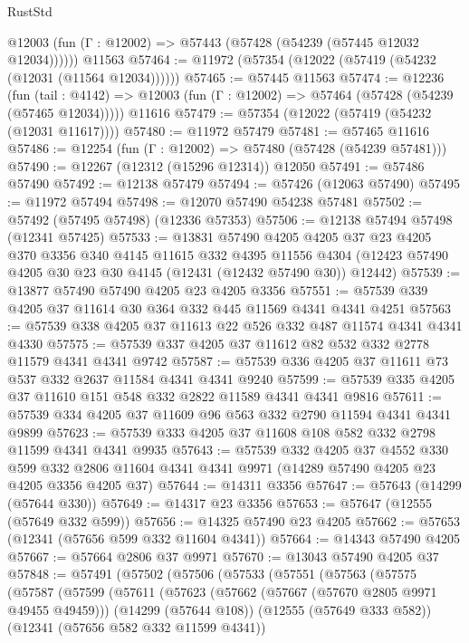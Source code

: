 \begin{lexlean}{RustStd}
\begin{coremodule}
      @12003 (fun (Γ : @12002) => @57443 (@57428 (@54239 (@57445 @12032 @12034))))))
    @11563
@57464 := @11972 (@57354 (@12022 (@57419 (@54232 (@12031 (@11564 @12034))))))
@57465 := @57445 @11563
@57474 := @12236
    (fun (tail : @4142) => @12003 (fun (Γ : @12002) => @57464 (@57428 (@54239 (@57465 @12034)))))
    @11616
@57479 := @57354 (@12022 (@57419 (@54232 (@12031 @11617))))
@57480 := @11972 @57479
@57481 := @57465 @11616
@57486 := @12254 (fun (Γ : @12002) => @57480 (@57428 (@54239 @57481)))
@57490 := @12267 (@12312 (@15296 @12314)) @12050
@57491 := @57486 @57490
@57492 := @12138 @57479
@57494 := @57426 (@12063 @57490)
@57495 := @11972 @57494
@57498 := @12070 @57490 @54238 @57481
@57502 := @57492 (@57495 @57498) (@12336 @57353)
@57506 := @12138 @57494 @57498 (@12341 @57425)
@57533 := @13831
    @57490
    @4205
    @4205
    @37
    @23
    @4205
    @370
    @3356
    @340
    @4145
    @11615
    @332
    @4395
    @11556
    @4304
    (@12423 @57490 @4205 @30 @23 @30 @4145 (@12431 (@12432 @57490 @30)) @12442)
@57539 := @13877 @57490 @57490 @4205 @23 @4205 @3356
@57551 := @57539 @339 @4205 @37 @11614 @30 @364 @332 @445 @11569 @4341 @4341 @4251
@57563 := @57539 @338 @4205 @37 @11613 @22 @526 @332 @487 @11574 @4341 @4341 @4330
@57575 := @57539 @337 @4205 @37 @11612 @82 @532 @332 @2778 @11579 @4341 @4341 @9742
@57587 := @57539 @336 @4205 @37 @11611 @73 @537 @332 @2637 @11584 @4341 @4341 @9240
@57599 := @57539 @335 @4205 @37 @11610 @151 @548 @332 @2822 @11589 @4341 @4341 @9816
@57611 := @57539 @334 @4205 @37 @11609 @96 @563 @332 @2790 @11594 @4341 @4341 @9899
@57623 := @57539 @333 @4205 @37 @11608 @108 @582 @332 @2798 @11599 @4341 @4341 @9935
@57643 := @57539
    @332
    @4205
    @37
    @4552
    @330
    @599
    @332
    @2806
    @11604
    @4341
    @4341
    @9971
    (@14289 @57490 @4205 @23 @4205 @3356 @4205 @37)
@57644 := @14311 @3356
@57647 := @57643 (@14299 (@57644 @330))
@57649 := @14317 @23 @3356
@57653 := @57647 (@12555 (@57649 @332 @599))
@57656 := @14325 @57490 @23 @4205
@57662 := @57653 (@12341 (@57656 @599 @332 @11604 @4341))
@57664 := @14343 @57490 @4205
@57667 := @57664 @2806 @37 @9971
@57670 := @13043 @57490 @4205 @37
@57848 := @57491
    (@57502
      (@57506
        (@57533
          (@57551
            (@57563
              (@57575
                (@57587
                  (@57599
                    (@57611
                      (@57623
                        (@57662 (@57667 (@57670 @2805 @9971 @49455 @49459)))
                        (@14299 (@57644 @108))
                        (@12555 (@57649 @333 @582))
                        (@12341 (@57656 @582 @332 @11599 @4341))

\end{coremodule}
\end{lexlean}
